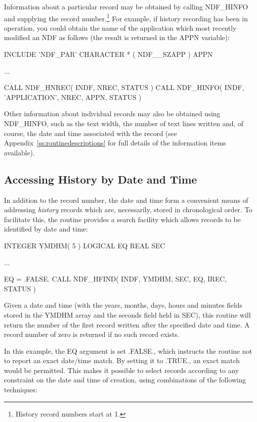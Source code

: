 \documentclass[twoside,11pt,nolof]{starlink}
\providecommand{\st}[1]{{\emph{#1}}}
\begin{document}
Information about a particular record may be obtained by calling
NDF\_HINFO and supplying the record number.\footnote{History record
numbers start at 1.} For example, if history recording has been in
operation, you could obtain the name of the application which most
recently modified an NDF as follows (the result is returned in the
APPN variable):

\small
\begin{terminalv}
      INCLUDE 'NDF_PAR'
      CHARACTER * ( NDF__SZAPP ) APPN

      ...

      CALL NDF_HNREC( INDF, NREC, STATUS )
      CALL NDF_HINFO( INDF, 'APPLICATION', NREC, APPN, STATUS )
\end{terminalv}
\normalsize

Other information about individual records may also be obtained using
NDF\_HINFO, such as the text width, the number of text lines written
and, of course, the date and time associated with the record (see
Appendix~\ref{ss:routinedescriptions} for full details of the
information items available).

\subsection{Accessing History by Date and Time}

In addition to the record number, the date and time form a convenient
means of addressing \st{history\/} records which are, necessarily, stored in
chronological order. To facilitate this, the  routine
provides a search facility which allows records to be identified by
date and time:

\small
\begin{terminalv}
      INTEGER YMDHM( 5 )
      LOGICAL EQ
      REAL SEC

      ...

      EQ = .FALSE.
      CALL NDF_HFIND( INDF, YMDHM, SEC, EQ, IREC, STATUS )
\end{terminalv}
\normalsize

Given a date and time (with the years, months, days, hours and minutes
fields stored in the YMDHM array and the seconds field held in SEC),
this routine will return the number of the first record written after
the specified date and time. A record number of zero is returned if no
such record exists.

In this example, the EQ argument is set .FALSE., which instructs the
routine not to report an exact date/time match. By setting it to
.TRUE., an exact match would be permitted. This makes it possible to
select records according to any constraint on the date and time of
creation, using combinations of the following techniques:
\end{document}
